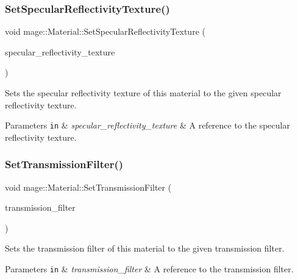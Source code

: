 \subsubsection{\texorpdfstring{Set\+Specular\+Reflectivity\+Texture()}{SetSpecularReflectivityTexture()}}
{\footnotesize\ttfamily void mage\+::\+Material\+::\+Set\+Specular\+Reflectivity\+Texture (\begin{DoxyParamCaption}\item[{const \hyperlink{namespacemage_a1e01ae66713838a7a67d30e44c67703e}{Shared\+Ptr}$<$ const \hyperlink{classmage_1_1_texture}{Texture} $>$ \&}]{specular\+\_\+reflectivity\+\_\+texture }\end{DoxyParamCaption})}

Sets the specular reflectivity texture of this material to the given specular reflectivity texture.


\begin{DoxyParams}[1]{Parameters}
\mbox{\tt in}  & {\em specular\+\_\+reflectivity\+\_\+texture} & A reference to the specular reflectivity texture. \\
\hline
\end{DoxyParams}
\hypertarget{structmage_1_1_material_afe8121e13eb9fff9ffb281e7c807f2e0}{}\label{structmage_1_1_material_afe8121e13eb9fff9ffb281e7c807f2e0} 
\subsubsection{\texorpdfstring{Set\+Transmission\+Filter()}{SetTransmissionFilter()}\hspace{0.1cm}{\footnotesize\ttfamily [1/2]}}
{\footnotesize\ttfamily void mage\+::\+Material\+::\+Set\+Transmission\+Filter (\begin{DoxyParamCaption}\item[{const \hyperlink{structmage_1_1_r_g_b_spectrum}{R\+G\+B\+Spectrum} \&}]{transmission\+\_\+filter }\end{DoxyParamCaption})\hspace{0.3cm}{\ttfamily [noexcept]}}

Sets the transmission filter of this material to the given transmission filter.


\begin{DoxyParams}[1]{Parameters}
\mbox{\tt in}  & {\em transmission\+\_\+filter} & A reference to the transmission filter. \\
\hline
\end{DoxyParams}
\hypertarget{structmage_1_1_material_abc6f63bd40b00c81bc799ef1f2ca01e9}{}\label{structmage_1_1_material_abc6f63bd40b00c81bc799ef1f2ca01e9} 
